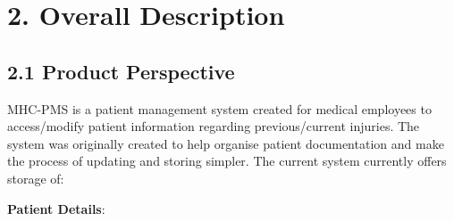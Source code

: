 \documentclass[12pt]{article}
\renewcommand{\_}{\kern-1.5pt\textunderscore\kern-1.5pt}
\begin{document}
\section*{2. Overall Description}
\subsection*{2.1 \hspace*{10pt}Product Perspective}
MHC-PMS is a patient management system created for medical employees to access/modify patient information regarding previous/current injuries. The system was originally created to help organise patient documentation and make the process of updating and storing simpler. The current system currently offers storage of:\par


\vspace{\baselineskip}
\begin{adjustwidth}{0.5in}{0.0in}
\textbf{Patient Details}:\par

\end{adjustwidth}
\end{document}
